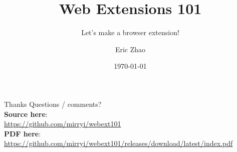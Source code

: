 \documentclass[xcolor={dvipsnames},xtable]{beamer}
\title{Web Extensions 101}
\subtitle{Let's make a browser extension!}
\date{\today}
\author{Eric Zhao}
\begin{document}

\newcommand{\sectiontitle}{}
\newcommand{\currenttitle}{}

\maketitle

\newcommand{\subdir}{sections}
\newcommand{\emojisubdir}{emojisub}
\newcommand{\templatedir}{template}






\renewcommand{\currenttitle}{Thanks}
\begin{frame}{\currenttitle}
  Questions / comments? \\[3em]

  \textbf{Source here}: \\
  {\scriptsize \url{https://github.com/mirryi/webext101}} \\[1em]

  \textbf{PDF here}: \\
  {\scriptsize \url{https://github.com/mirryi/webext101/releases/download/latest/index.pdf}}
\end{frame}
\end{document}
